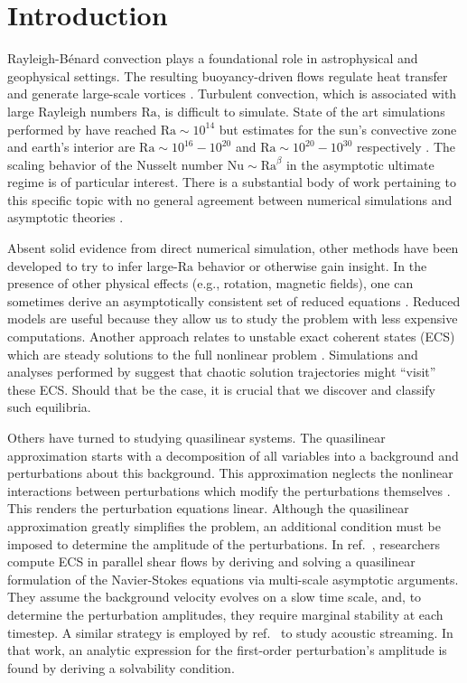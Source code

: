 \documentclass[reprint,amsmath,amssymb,aps,nofootinbib]{revtex4-1}
\newcommand\Ra{\mathrm{Ra}}
\newcommand\Nu{\mathrm{Nu}}
\renewcommand{\citet}[1]{ref.~\cite{#1}}
\begin{document}
\section{Introduction}
Rayleigh-B\'enard convection plays a foundational role in astrophysical and geophysical settings.
The resulting buoyancy-driven flows regulate heat transfer and generate large-scale vortices \cite{Couston}.
Turbulent convection, which is associated with large Rayleigh numbers $\Ra$, is difficult to simulate. 
State of the art simulations performed by \cite{Zhu_2018} have reached $\Ra \sim 10^{14}$ but estimates for the sun's convective zone and earth's interior are $\Ra \sim 10^{16}-10^{20}$ and $\Ra \sim 10^{20}-10^{30}$ respectively \cite{Ossendrijver,Gubbins_2001}. 
The scaling behavior of the Nusselt number $\Nu \sim \Ra^{\beta}$ in the asymptotic ultimate regime is of particular interest.
There is a substantial body of work pertaining to this specific topic with no general agreement between numerical simulations and asymptotic theories \cite{Malkus_1954, Howard_1966, Kraichnan, Spiegel, Castaing, Grossman, Ahlers}. 

Absent solid evidence from direct numerical simulation, other methods have been developed to try to infer large-$\Ra$ behavior or otherwise gain insight.
In the presence of other physical effects (e.g., rotation, magnetic fields), one can sometimes derive an asymptotically consistent set of reduced equations \cite{Julien2007, Julien2012}.
Reduced models are useful because they allow us to study the problem with less expensive computations.
Another approach relates to unstable exact coherent states (ECS) which are steady solutions to the full nonlinear problem \cite{Waleffe, Sondak, Wen, chini_cells}. 
Simulations and analyses performed by \cite{Yalniz, Cvitanovic} suggest that chaotic solution trajectories might ``visit'' these ECS.
Should that be the case, it is crucial that we discover and classify such equilibria. 

Others have turned to studying quasilinear systems.
The quasilinear approximation starts with a decomposition of all variables into a background and perturbations about this background.
This approximation neglects the nonlinear interactions between perturbations which modify the perturbations themselves \cite{marston2016}.
This renders the perturbation equations linear.
Although the quasilinear approximation greatly simplifies the problem, an additional condition must be imposed to determine the amplitude of the perturbations.
In \citet{Beaume_2015}, researchers compute ECS in parallel shear flows by deriving and solving a quasilinear formulation of the Navier-Stokes equations via multi-scale asymptotic arguments. 
They assume the background velocity evolves on a slow time scale, and, to determine the perturbation amplitudes, they require marginal stability at each timestep.
A similar strategy is employed by \citet{michel_chini_2019} to study acoustic streaming.
In that work, an analytic expression for the first-order perturbation's amplitude is found by deriving a solvability condition.
\end{document}
